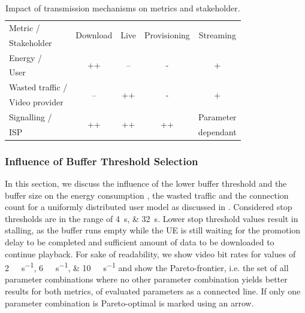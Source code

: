 \begin{table}
  \centering
  \begin{tabular}{lcccc}
    \toprule
    Metric /& \multirow{2}{*}{Download} & \multirow{2}{*}{Live} & \multirow{2}{*}{Provisioning} & \multirow{2}{*}{Streaming}\\
    Stakeholder & & & &\\
    \midrule
    Energy /       & \multirow{2}{*}{++}       & \multirow{2}{*}{--}   & \multirow{2}{*}{-} & \multirow{2}{*}{+}\\
    User & & & &\\
    Wasted traffic / & \multirow{2}{*}{--} & \multirow{2}{*}{++} & \multirow{2}{*}{-} & \multirow{2}{*}{+} \\
    Video provider & & & &\\
    Signalling /& \multirow{2}{*}{++} & \multirow{2}{*}{++} & \multirow{2}{*}{++} & Parameter\\
    \gls{ISP} & & & &dependant\\
    \bottomrule
  \end{tabular}
  \caption{Impact of transmission mechanisms on metrics and stakeholder.}
  \label{tab:application:lte_video:trade_offs:mechanism_selection:lessons_learned}
\end{table}

\subsubsection*{Influence of Buffer Threshold Selection}\label{sec:application:lte_video:trade_offs:buffer_threshold_influence}

In this section, we discuss the influence of the lower buffer threshold \bufferlower and the buffer size \buffersize on the energy consumption \energyconsumption, the wasted traffic \meanwastedtraffic and the connection count \connectioncount for a uniformly distributed user model as discussed in .
Considered stop thresholds are in the range of \SIlist{4;32}{\second}.
Lower stop threshold values result in stalling, as the buffer runs empty while the \gls{UE} is still waiting for the promotion delay to be completed and sufficient amount of data to be downloaded to continue playback.
For sake of readability, we show video bit rates \bitrate for values of \SIlist{2;6;10}{\mega\bit\per\second} and show the Pareto-frontier, i.e. the set of all parameter combinations where no other parameter combination yields better results for both metrics, of evaluated parameters as a connected line.
If only one parameter combination is Pareto-optimal is marked using an arrow.

